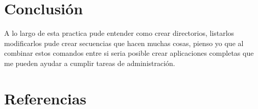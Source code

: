 \documentclass[11pt]{article}
\begin{document}
\section{Conclusión}
\label{sec:org1dceee5}
A lo largo de esta practica pude entender como crear directorios, listarlos
modificarlos pude crear secuencias que hacen muchas cosas, pienso yo que 
al combinar estos comandos entre si seria posible crear aplicaciones completas 
que me pueden ayudar a cumplir tareas de administración. 

\pagebreak

\section{Referencias}
\label{sec:orgdc9faa2}
\printbibliography[heading=none]
\end{document}
